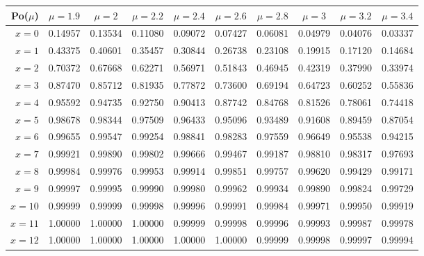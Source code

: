 \vspace{8pt minus 6pt}
\begin{tabular}{r|ccccccccc}
Po($\mu$)& $\mu=1.9$ & $\mu=2$ & $\mu=2.2$ & $\mu=2.4$ & $\mu=2.6$ & $\mu=2.8$ & $\mu=3$ & $\mu=3.2$ & $\mu=3.4$ \\\hline
$x= 0$&0.14957&0.13534&0.11080&0.09072&0.07427&0.06081&0.04979&0.04076&0.03337\\
$x= 1$&0.43375&0.40601&0.35457&0.30844&0.26738&0.23108&0.19915&0.17120&0.14684\\
$x= 2$&0.70372&0.67668&0.62271&0.56971&0.51843&0.46945&0.42319&0.37990&0.33974\\
$x= 3$&0.87470&0.85712&0.81935&0.77872&0.73600&0.69194&0.64723&0.60252&0.55836\\
$x= 4$&0.95592&0.94735&0.92750&0.90413&0.87742&0.84768&0.81526&0.78061&0.74418\\
$x= 5$&0.98678&0.98344&0.97509&0.96433&0.95096&0.93489&0.91608&0.89459&0.87054\\
$x= 6$&0.99655&0.99547&0.99254&0.98841&0.98283&0.97559&0.96649&0.95538&0.94215\\
$x= 7$&0.99921&0.99890&0.99802&0.99666&0.99467&0.99187&0.98810&0.98317&0.97693\\
$x= 8$&0.99984&0.99976&0.99953&0.99914&0.99851&0.99757&0.99620&0.99429&0.99171\\
$x= 9$&0.99997&0.99995&0.99990&0.99980&0.99962&0.99934&0.99890&0.99824&0.99729\\
$x=10$&0.99999&0.99999&0.99998&0.99996&0.99991&0.99984&0.99971&0.99950&0.99919\\
$x=11$&1.00000&1.00000&1.00000&0.99999&0.99998&0.99996&0.99993&0.99987&0.99978\\
$x=12$&1.00000&1.00000&1.00000&1.00000&1.00000&0.99999&0.99998&0.99997&0.99994\\

\end{tabular}

